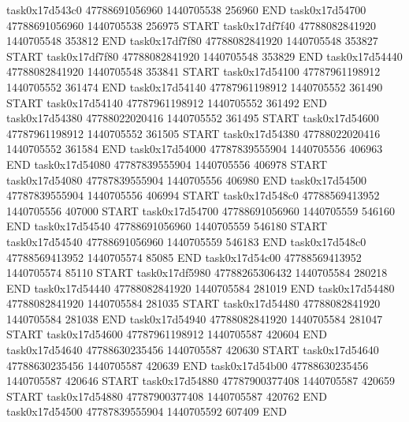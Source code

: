task0x17d543c0 47788691056960          1440705538               256960  END
task0x17d54700 47788691056960          1440705538               256975  START
task0x17df7f40 47788082841920          1440705548               353812  END
task0x17df7f80 47788082841920          1440705548               353827  START
task0x17df7f80 47788082841920          1440705548               353829  END
task0x17d54440 47788082841920          1440705548               353841  START
task0x17d54100 47787961198912          1440705552               361474  END
task0x17d54140 47787961198912          1440705552               361490  START
task0x17d54140 47787961198912          1440705552               361492  END
task0x17d54380 47788022020416          1440705552               361495  START
task0x17d54600 47787961198912          1440705552               361505  START
task0x17d54380 47788022020416          1440705552               361584  END
task0x17d54000 47787839555904          1440705556               406963  END
task0x17d54080 47787839555904          1440705556               406978  START
task0x17d54080 47787839555904          1440705556               406980  END
task0x17d54500 47787839555904          1440705556               406994  START
task0x17d548c0 47788569413952          1440705556               407000  START
task0x17d54700 47788691056960          1440705559               546160  END
task0x17d54540 47788691056960          1440705559               546180  START
task0x17d54540 47788691056960          1440705559               546183  END
task0x17d548c0 47788569413952          1440705574                85085  END
task0x17d54c00 47788569413952          1440705574                85110  START
task0x17df5980 47788265306432          1440705584               280218  END
task0x17d54440 47788082841920          1440705584               281019  END
task0x17d54480 47788082841920          1440705584               281035  START
task0x17d54480 47788082841920          1440705584               281038  END
task0x17d54940 47788082841920          1440705584               281047  START
task0x17d54600 47787961198912          1440705587               420604  END
task0x17d54640 47788630235456          1440705587               420630  START
task0x17d54640 47788630235456          1440705587               420639  END
task0x17d54b00 47788630235456          1440705587               420646  START
task0x17d54880 47787900377408          1440705587               420659  START
task0x17d54880 47787900377408          1440705587               420762  END
task0x17d54500 47787839555904          1440705592               607409  END
